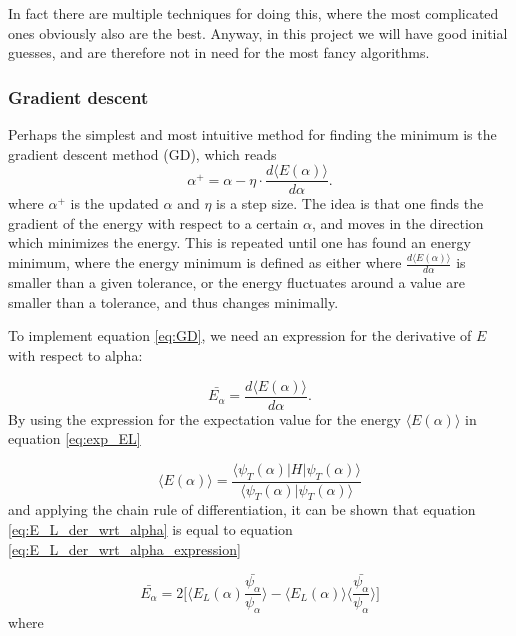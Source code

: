 \documentclass[norsk,a4paper,12pt]{article}
\begin{document}
In fact there are multiple techniques for doing this, where the most complicated ones obviously also are the best. Anyway, in this project we will have good initial guesses, and are therefore not in need for the most fancy algorithms. 

\subsubsection{Gradient descent}
Perhaps the simplest and most intuitive method for finding the minimum is the gradient descent method (GD), which reads
\begin{equation}
\label{eq:GD}
\alpha^+=\alpha - \eta\cdot\frac{d\langle E(\alpha)\rangle}{d\alpha}.
\end{equation}
where $\alpha^+$ is the updated $\alpha$ and $\eta$ is a step size. The idea is that one finds the gradient of the energy with respect to a certain $\alpha$, and moves in the direction which minimizes the energy. This is repeated until one has found an energy minimum, where the energy minimum is defined as either where $\frac{d\langle E(\alpha)\rangle}{d\alpha}$ is smaller than a given tolerance, or the energy fluctuates around a value are smaller than a tolerance, and thus changes minimally.
\par 
\vspace{3mm}

To implement equation \ref{eq:GD}, we need an expression for the derivative of $E$ with respect to alpha:

\begin{equation}
	\label{eq:E_L_der_wrt_alpha}
	\bar{E_{\alpha}} = \frac{d \langle E (\alpha) \rangle}{d \alpha}.
\end{equation}
By using the expression for the expectation value for the energy $ \langle E (\alpha) \rangle$ in equation \ref{eq:exp_EL} 

\begin{equation}
	\label{eq:exp_EL}
	\langle E (\alpha) \rangle = \frac{ \langle \psi_T(\alpha) | H | \psi_T(\alpha)  \rangle}{ \langle \psi_T(\alpha)  |  \psi_T(\alpha)  \rangle }
\end{equation}
and applying the chain rule of differentiation, it can be shown that equation \ref{eq:E_L_der_wrt_alpha} is equal to equation \ref{eq:E_L_der_wrt_alpha_expression}

\begin{equation}
	\label{eq:E_L_der_wrt_alpha_expression}
	\bar{E_{\alpha}} = 2 \bigg[\langle E_L (\alpha)  \frac{ \bar{\psi_{\alpha}}}{\psi_{\alpha}}\rangle - \langle E_L (\alpha) \rangle \langle \frac{\bar{\psi_{\alpha}}}{\psi_{\alpha}} \rangle\bigg]
\end{equation}
where
\end{document}
